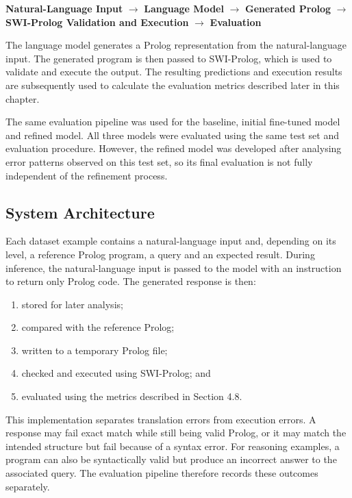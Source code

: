 \documentclass[11pt]{article} %
\theoremstyle{plain}
\theoremstyle{definition}
\begin{document}
\begin{tcolorbox}[title=System Pipeline]
 \centering 
\textbf{Natural-Language Input}
 $\rightarrow$
 \textbf{Language Model
} $\rightarrow$
 \textbf{Generated Prolog} 
$\rightarrow$ 
\textbf{SWI-Prolog Validation and Execution} 
$\rightarrow$ 
\textbf{Evaluation}
\end{tcolorbox}

The language model generates a Prolog representation from the
natural-language input. The generated program is then passed to
SWI-Prolog, which is used to validate and execute the output. The
resulting predictions and execution results are subsequently used to
calculate the evaluation metrics described later in this chapter.

The same evaluation pipeline was used for the baseline, initial fine-tuned
model and refined model. All three models were evaluated using the same
test set and evaluation procedure. However, the refined model was developed
after analysing error patterns observed on this test set, so its final evaluation
is not fully independent of the refinement process.

\subsection{System Architecture}

Each dataset example contains a natural-language input and, depending on its
level, a reference Prolog program, a query and an expected result. During
inference, the natural-language input is passed to the model with an instruction
to return only Prolog code. The generated response is then:

\begin{enumerate}
\item stored for later analysis;
\item compared with the reference Prolog;
\item written to a temporary Prolog file;
\item checked and executed using SWI-Prolog; and
\item evaluated using the metrics described in Section 4.8.
\end{enumerate}

This implementation separates translation errors from execution errors. A
response may fail exact match while still being valid Prolog, or it may match
the intended structure but fail because of a syntax error. For reasoning
examples, a program can also be syntactically valid but produce an incorrect
answer to the associated query. The evaluation pipeline therefore records these
outcomes separately.
\end{document}
